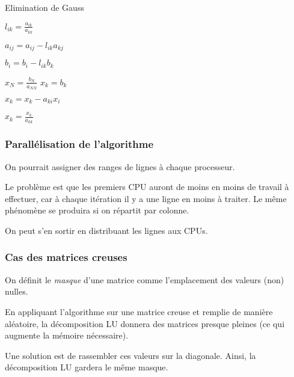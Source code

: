 \begin{algorithm}
\caption{Elimination de Gauss}
\begin{algorithmic}
		\STATE $l_{ik} = \frac{a_{ik}}{a_{kk}}$
		
			\STATE $a_{ij} = a_{ij} - l_{ik} a_{kj}$
		\ENDFOR
		
		\STATE $b_i = b_i - l_{ik} b_k$
	\ENDFOR
\ENDFOR

\STATE $x_N = \frac{b_N}{a_{NN}}$ 
	\STATE $x_k = b_k$
	
		\STATE $x_k = x_k - a_{ki} x_i$
	\ENDFOR
	
	\STATE $x_k = \frac{x_k}{a_{kk}}$

\ENDFOR
\end{algorithmic}
\end{algorithm}

	\subsubsection{Parallélisation de l'algorithme}
	
	On pourrait assigner des ranges de lignes à chaque processeur.
	
	
	Le problème est que les premiers CPU auront de moins en moins de travail à effectuer, car à chaque itération il y a une ligne en moins à traiter. Le même phénomène se produira si on répartit par colonne.
	
	On peut s'en sortir en distribuant les lignes aux CPUs.
	
	
	\subsubsection{Cas des matrices creuses}
	
	On définit le \textit{masque} d'une matrice comme l'emplacement des valeurs (non) nulles.
	
	En appliquant l'algorithme sur une matrice creuse et remplie de manière aléatoire, la décomposition LU donnera des matrices presque pleines (ce qui augmente la mémoire nécessaire).
	

	Une solution est de rassembler ces valeurs sur la diagonale. Ainsi, la décomposition LU gardera le même masque.
	
